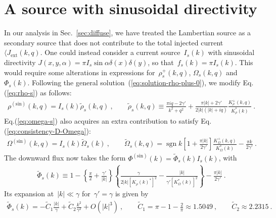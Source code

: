 \documentclass[preprint,aps,eqsecnum, prb]{revtex4-1}
\newcommand{\fplus}[1]{{#1}^{+}}
\newcommand{\sgn}{\mathop{\mathrm{sgn}}\nolimits}
\begin{document}

\section{A source with sinusoidal directivity}
\label{sec:app-sin-source}

In our analysis in Sec.~\ref{sec:diffuse}, we have
treated the Lambertian source as a secondary source that
does not contribute to the total injected
current~$\langle J_\mathrm{ext}(k, q)$. One could instead consider a
current source~$I_s(k)$ with sinusoidal directivity
$J(x, y, \alpha) = \pi I_s \sin\alpha \delta(x) \delta(y)$, 
so that~$f_s(k) = \pi I_s(k)$. This would require some alterations
in expressions for~$\fplus{\rho}_s(k, q)$, $\Omega_s(k, q)$ and~$\Phi_s(k)$.
Following the general solution~(\ref{eq:solution-rho-plus-0}), we
modify Eq.(\ref{eq:rho-s}) as follows:
\begin{align}
  \rho^\mathrm{(sin)}(k, q) = I_s(k) \tilde{\rho}_s(k, q)\ , \qquad
  \tilde{\rho}_s(k, q) \equiv \frac{\pi i q - 2 \gamma'}{k^2 + q^2}
  + \frac{\pi |k| + 2\gamma'}{2|k| (|k| + i q)}
  \frac{\fplus{K}_\rho(k, q)}{K_\rho^\ast(k)}\ . 
\end{align}
Eq.(\ref{eq:omega-s}) also acquires an extra contribution
to satisfy Eq.(\ref{eq:consistency-D-Omega}):
\begin{align}
  \Omega^\mathrm{(sin)}(k, q) = I_s(k) \tilde{\Omega}_s(k)\ , \qquad
  \tilde{\Omega}_s(k, q) = \sgn k  \left[1 + \frac{\pi |k|}{2\gamma'}\right]
  \frac{\fplus{K}_\Omega(k, q)}{K_\Omega^\ast(k)} - \frac{\pi k}{2\gamma'}\ .
\end{align}
The downward flux now takes the form
$\Phi^\mathrm{(sin)}(k) = \tilde{\Phi}_s(k) I_s(k)$, with
\begin{align}
  \tilde{\Phi}_s(k) \equiv
  1 -   \left\{\frac{\pi}{2} + \frac{\gamma'}{|k|} \right\}
  \left\{\frac{\gamma}{2|k| \left[K_\rho(k)^\ast\right]^2}
  - \frac{|k|}{\gamma' \left[K_\Omega^\ast(k)\right]^2}
  \right\}
  - \frac{\pi |k|}{2\gamma'}\ . 
\end{align}
Its expansion at~$|k| \ll \gamma$ for~$\gamma' = \gamma$ is given by
\begin{align}
  \tilde{\Phi}_s(k) =
  - {\tilde C}_1 \frac{|k|}{\gamma} + \tilde{C}_2 \frac{k^2}{\gamma^2}
  + O(|k|^3)\ ,
  \qquad
  \tilde{C}_1 = \pi - 1 - \frac{2}{\pi} \approx 1.5049\ ,
  \qquad\tilde{C}_2 \approx 2.2315\ . 
\end{align}
\end{document}
